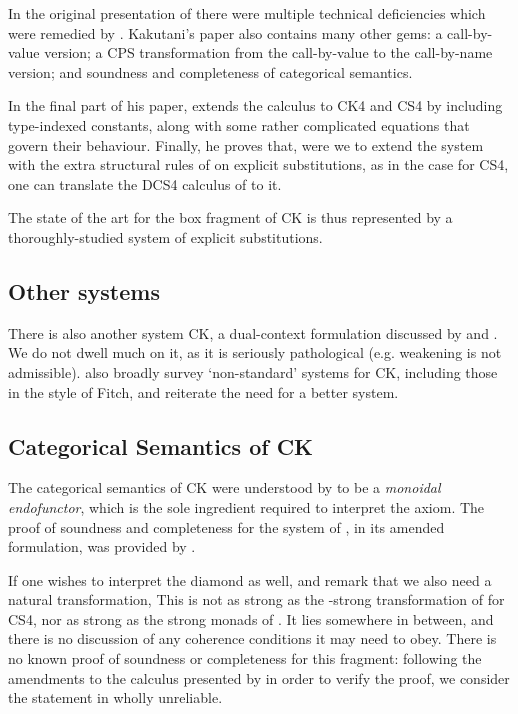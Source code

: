 \documentclass[a4paper]{amsart}
\begin{document}
In the original presentation of \cite{Bellin2001} there were
multiple technical deficiencies which were remedied by
\cite{Kakutani2007a}. Kakutani's paper also contains many other
gems: a call-by-value version; a CPS transformation from the
call-by-value to the call-by-name version; and soundness and
completeness of categorical semantics. 

In the final part of his paper, \cite{Kakutani2007a} extends the
calculus to \textsf{CK4} and \textsf{CS4} by including
type-indexed constants,  along with some rather complicated equations that
govern their behaviour. Finally, he proves that, were we to
extend the system with the extra structural rules of
\cite{Goubault-Larrecq1996} on explicit substitutions, as in the
case for \textsf{CS4}, one can translate the \textsf{DCS4}
calculus of \cite{Davies2001} to it.

The state of the art for the box fragment of \textsf{CK} is thus
represented by a thoroughly-studied system of explicit
substitutions.

\subsection{Other systems}

There is also another system \textsf{CK}, a dual-context
formulation discussed by \cite{Bellin2001} and \cite{dePaiva2011}.
We do not dwell much on it, as it is seriously pathological (e.g.
weakening is not admissible). \cite{dePaiva2011} also broadly
survey `non-standard' systems for \textsf{CK}, including those in
the style of Fitch, and reiterate the need for a better system.

\subsection{Categorical Semantics of \textsf{CK}}

The categorical semantics of \textsf{CK} were understood by
\cite{Bellin2001} to be a \emph{monoidal endofunctor}, which is
the sole ingredient required to interpret the 
axiom. The proof of soundness and completeness for the system of
\cite{Bellin2001}, in its amended formulation, was provided by
\cite{Kakutani2007a}.

If one wishes to interpret the diamond as well, \cite{Bellin2001}
and \cite{dePaiva2011} remark that we also need a natural
transformation,  This is not as strong as the -strong transformation
of \cite{Kobayashi1997} for \textsf{CS4}, nor as strong as the
strong monads of \cite{Moggi1991}. It lies somewhere in between,
and there is no discussion of any coherence conditions it may need
to obey. There is no known proof of soundness or completeness for
this fragment: following the amendments to the calculus presented
by \cite{Kakutani2007a} in order to verify the proof, we consider
the statement in \citep{Bellin2001} wholly unreliable.
\end{document}
